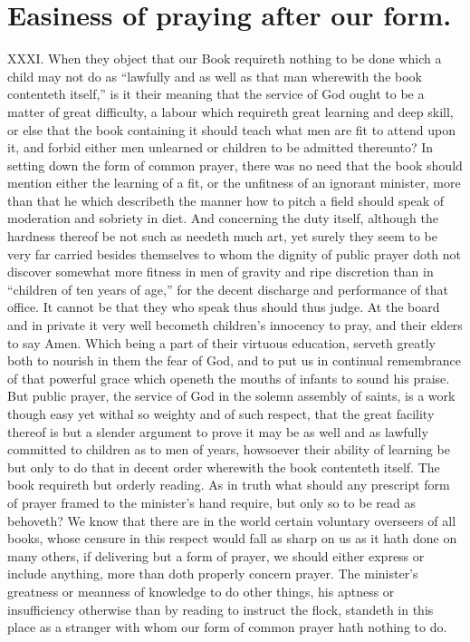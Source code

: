 \section*{Easiness of praying after our form.}
XXXI. When they object that our Book requireth nothing to be done which a child may not do as “lawfully and as well as that man wherewith the book contenteth itself,” is it their meaning that the service of God ought to be a matter of great difficulty, a labour which requireth great learning and  deep skill, or else that the book containing it should teach what men are fit to attend upon it, and forbid either men unlearned or children to be admitted thereunto? In setting down the form of common prayer, there was no need that the book should mention either the learning of a fit, or the unfitness of an ignorant minister, more than that he which describeth the manner how to pitch a field should speak of moderation and sobriety in diet.
And concerning the duty itself, although the hardness thereof be not such as needeth much art, yet surely they seem to be very far carried besides themselves to whom the dignity of public prayer doth not discover somewhat more fitness in men of gravity and ripe discretion than in “children of ten years of age,” for the decent discharge and performance of that office. It cannot be that they who speak thus should thus judge. At the board and in private it very well becometh children’s innocency to pray, and their elders to say Amen. Which being a part of their virtuous education, serveth greatly both to nourish in them the fear of God, and to put us in continual remembrance of that powerful grace which openeth the mouths of infants to sound his praise. But public prayer, the service of God in the solemn assembly of saints, is a work though easy yet withal so weighty and of such respect, that the great facility thereof is but a slender argument to prove it may be as well and as lawfully committed to children as to men of years, howsoever their ability of learning be but only to do that in decent order wherewith the book contenteth itself.
The book requireth but orderly reading. As in truth what should any prescript form of prayer framed to the minister’s hand require, but only so to be read as behoveth? We know that there are in the world certain voluntary overseers of all books, whose censure in this respect would fall as sharp on us as it hath done on many others, if delivering but a form of prayer, we should either express or include anything, more than doth properly concern prayer. The minister’s greatness or meanness of knowledge to do other things,  his aptness or insufficiency otherwise than by reading to instruct the flock, standeth in this place as a stranger with whom our form of common prayer hath nothing to do.
